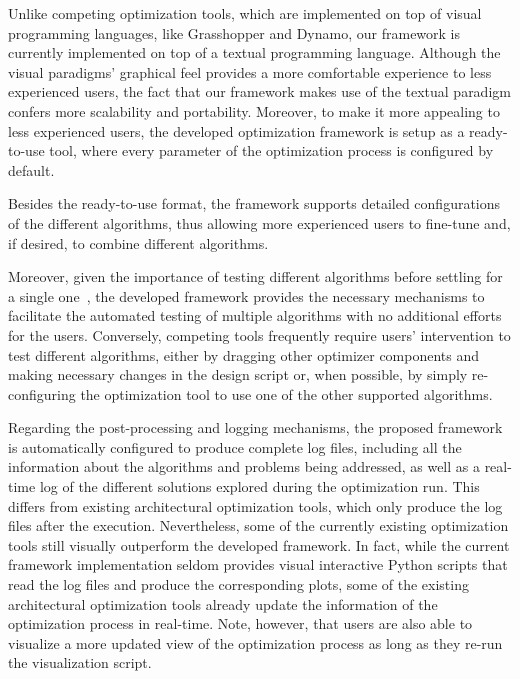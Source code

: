 Unlike competing optimization tools, which are implemented on top of visual programming languages, like Grasshopper and Dynamo, our framework is currently implemented on top of a textual programming language. Although the visual paradigms' graphical feel provides a more comfortable experience to less experienced users, the fact that our framework makes use of the textual paradigm confers more scalability and portability.%
Moreover, to make it more appealing to less experienced users, the developed optimization framework is setup as a ready-to-use tool, where every parameter of the optimization process is configured by default.  

Besides the ready-to-use format, the framework supports detailed configurations of the different algorithms, thus allowing more experienced users to fine-tune and, if desired, to combine different algorithms. 

Moreover, given the importance of testing different algorithms before settling for a single one~\cite{Wortmann2016BBO}, the developed framework provides the necessary mechanisms to facilitate the automated testing of multiple algorithms with no additional efforts for the users. Conversely, competing tools frequently require users' intervention to test different algorithms, either by dragging other optimizer components and making necessary changes in the design script or, when possible, by simply re-configuring the optimization tool to use one of the other supported algorithms. 

Regarding the post-processing and logging mechanisms, the proposed framework is automatically configured to produce complete log files, including all the information about the algorithms and problems being addressed, as well as a real-time log of the different solutions explored during the optimization run. This differs from existing architectural optimization tools, which only produce the log files after the execution. Nevertheless, some of the currently existing optimization tools still visually outperform the developed framework. In fact, while the current framework implementation seldom provides visual interactive Python scripts that read the log files and produce the corresponding plots, some of the existing architectural optimization tools already update the information of the optimization process in real-time. Note, however, that users are also able to visualize a more updated view of the optimization process as long as they re-run the visualization script. 

